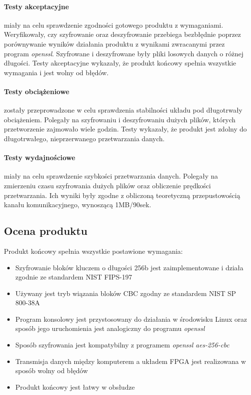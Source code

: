 \paragraph{Testy akceptacyjne} miały na celu sprawdzenie zgodności gotowego produktu z wymaganiami. Weryfikowały, czy szyfrowanie oraz deszyfrowanie przebiega bezbłędnie poprzez porównywanie wyników działania produktu z wynikami zwracanymi przez program \textit{openssl}. Szyfrowane i deszyfrowane były pliki losowych danych o różnej długości. Testy akceptacyjne wykazały, że  produkt końcowy spełnia wszystkie wymagania i jest wolny od błędów.

\paragraph{Testy obciążeniowe} zostały przeprowadzone w celu sprawdzenia stabilności układu pod długotrwały obciążeniem. Polegały na szyfrowaniu i deszyfrowaniu dużych plików, których przetworzenie zajmowało wiele godzin. Testy wykazały, że produkt jest zdolny do długotrwałego, nieprzerwanego przetwarzania danych.

\paragraph{Testy wydajnościowe} miały na celu sprawdzenie szybkości przetwarzania danych. Polegały na zmierzeniu czasu szyfrowania dużych plików oraz obliczenie prędkości przetwarzania. Ich wyniki były zgodne z obliczoną teoretyczną przepustowością kanału komunikacyjnego, wynoszącą 1MB/90sek.

\subsection{Ocena produktu}
Produkt końcowy spełnia wszystkie postawione wymagania:
\begin{itemize}
\item Szyfrowanie bloków kluczem o długości 256b jest zaimplementowane i działa zgodnie ze standardem NIST FIPS-197 \cite{aes-standard}
\item Używany jest tryb wiązania bloków CBC zgodny ze standardem NIST SP 800-38A \cite{cbc-standard}
\item Program konsolowy jest przystosowany do działania w środowisku Linux oraz sposób jego uruchomienia jest analogiczny do programu \textit{openssl}
\item Sposób szyfrowania jest kompatybilny z programem \textit{openssl aes-256-cbc} 
\item Transmisja danych między komputerem a układem FPGA jest realizowana w sposób wolny od błędów
\item Produkt końcowy jest łatwy w obsłudze
\end{itemize}

